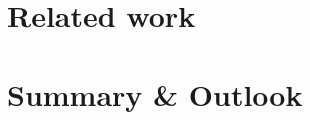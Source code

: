 \documentclass[sigplan,11pt,nonacm]{acmart}
\begin{document}
\section{Related work}
\label{sec:relatedwork}


\section{Summary \& Outlook}
\label{sec:summary}





\end{document}
